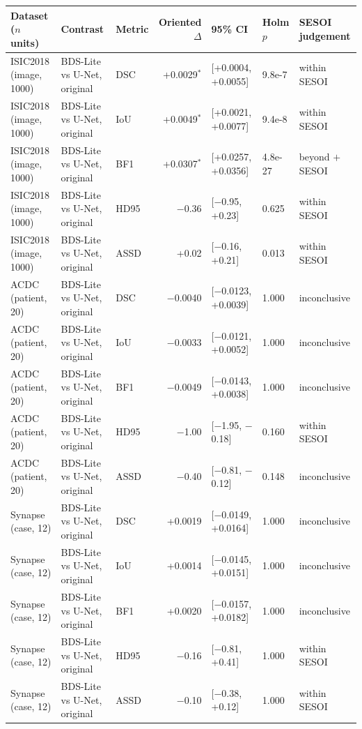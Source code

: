 \begin{tabular}{lllrlll}
\toprule
Dataset ($n$ units) & Contrast & Metric & Oriented $\Delta$ & 95\% CI & Holm $p$ & SESOI judgement \\
\midrule
ISIC2018 (image, 1000) & BDS-Lite vs U-Net, original & DSC & +0.0029$^{*}$ & [+0.0004, +0.0055] & 9.8e-7 & within SESOI \\
ISIC2018 (image, 1000) & BDS-Lite vs U-Net, original & IoU & +0.0049$^{*}$ & [+0.0021, +0.0077] & 9.4e-8 & within SESOI \\
ISIC2018 (image, 1000) & BDS-Lite vs U-Net, original & BF1 & +0.0307$^{*}$ & [+0.0257, +0.0356] & 4.8e-27 & beyond $+$SESOI \\
ISIC2018 (image, 1000) & BDS-Lite vs U-Net, original & HD95 & $-$0.36 & [$-$0.95, +0.23] & 0.625 & within SESOI \\
ISIC2018 (image, 1000) & BDS-Lite vs U-Net, original & ASSD & +0.02 & [$-$0.16, +0.21] & 0.013 & within SESOI \\
\midrule
ACDC (patient, 20) & BDS-Lite vs U-Net, original & DSC & $-$0.0040 & [$-$0.0123, +0.0039] & 1.000 & inconclusive \\
ACDC (patient, 20) & BDS-Lite vs U-Net, original & IoU & $-$0.0033 & [$-$0.0121, +0.0052] & 1.000 & inconclusive \\
ACDC (patient, 20) & BDS-Lite vs U-Net, original & BF1 & $-$0.0049 & [$-$0.0143, +0.0038] & 1.000 & inconclusive \\
ACDC (patient, 20) & BDS-Lite vs U-Net, original & HD95 & $-$1.00 & [$-$1.95, $-$0.18] & 0.160 & within SESOI \\
ACDC (patient, 20) & BDS-Lite vs U-Net, original & ASSD & $-$0.40 & [$-$0.81, $-$0.12] & 0.148 & inconclusive \\
\midrule
Synapse (case, 12) & BDS-Lite vs U-Net, original & DSC & +0.0019 & [$-$0.0149, +0.0164] & 1.000 & inconclusive \\
Synapse (case, 12) & BDS-Lite vs U-Net, original & IoU & +0.0014 & [$-$0.0145, +0.0151] & 1.000 & inconclusive \\
Synapse (case, 12) & BDS-Lite vs U-Net, original & BF1 & +0.0020 & [$-$0.0157, +0.0182] & 1.000 & inconclusive \\
Synapse (case, 12) & BDS-Lite vs U-Net, original & HD95 & $-$0.16 & [$-$0.81, +0.41] & 1.000 & within SESOI \\
Synapse (case, 12) & BDS-Lite vs U-Net, original & ASSD & $-$0.10 & [$-$0.38, +0.12] & 1.000 & within SESOI \\
\bottomrule
\end{tabular}
